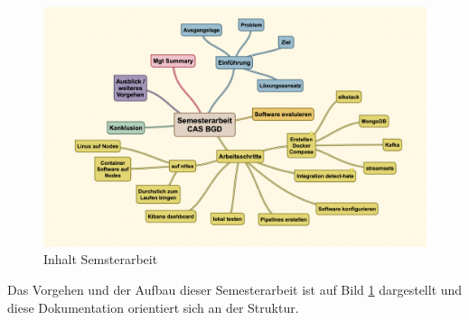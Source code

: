                                                                                                                                                                                                                                                                                                                                                                                                                                                                                                                                                                                                                                                                                                                                                                                            

\begin{figure}[H]
	\centering
		\includegraphics[scale=0.4 ]{images/inhalt_arbeit.png}
	\caption{Inhalt Semsterarbeit}
	\label{fig:inhalt_semesterarbeit}
\end{figure}

Das Vorgehen und der Aufbau dieser Semesterarbeit ist auf Bild \ref{fig:inhalt_semesterarbeit} dargestellt und diese Dokumentation orientiert sich an der Struktur. 

